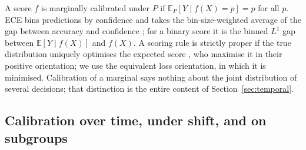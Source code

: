 \documentclass[11pt,a4paper]{article}
\numberwithin{equation}{section}
\theoremstyle{plain}
\theoremstyle{definition}
\theoremstyle{remark}
\newcommand{\E}{\mathbb{E}}
\begin{document}
A score $f$ is marginally calibrated under $P$ if $\E_P[Y \mid f(X)=p] = p$ for all $p$. ECE bins predictions by confidence and takes the bin-size-weighted average of the gap between accuracy and confidence \citep{guo2017}; for a binary score it is the binned $L^1$ gap between $\E[Y\mid f(X)]$ and $f(X)$. A scoring rule is strictly proper if the true distribution uniquely optimises the expected score \citep{gneiting2007}, who maximise it in their positive orientation; we use the equivalent loss orientation, in which it is minimised. Calibration of a marginal says nothing about the joint distribution of several decisions; that distinction is the entire content of Section~\ref{sec:temporal}.

\subsection{Calibration over time, under shift, and on subgroups}\label{sec:related}
\end{document}
